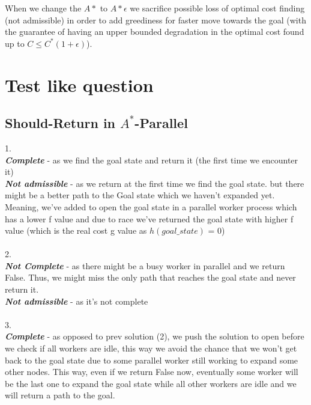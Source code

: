 \documentclass[12pt]{article}
\begin{document}
When we change the $A*$ to $A*\epsilon$ we sacrifice possible loss of optimal cost finding (not admissible)  in order to add greediness for faster move towards the goal (with the guarantee of having an upper bounded degradation in the optimal cost found up to $C \leq C^*(1+\epsilon)$).

\section{Test like question}

\subsection{Should-Return in $A^*$-Parallel}

1.\\

{\textit{\textbf{Complete}}} - as we find the goal state and return it (the first time we encounter it)\\

{\textit{\textbf{Not admissible}}} - as we return at the first time we find the goal state. but there might be a better path to the Goal state which we haven't expanded yet. Meaning, we've added to open the goal state in a parallel worker process which has a lower f value and due to race we've returned the goal state with higher f value (which is the real cost g value as $h(goal\_state)$ = 0)\\
\\
2.\\

{\textit{\textbf{Not Complete}}} - as there might be a busy worker in parallel and we return False. Thus, we might miss the only path that reaches the goal state and never return it.\\

{\textit{\textbf{Not admissible}}} - as it's not complete\\
\\
3.\\

{\textit{\textbf{Complete}}} - as opposed to prev solution (2), we push the solution to open before we check if all workers are idle, this way we avoid the chance that we won't get back to the goal state due to some parallel worker still working to expand some other nodes. This way, even if we return False now, eventually some worker will be the last one to expand the goal state while all other workers are idle and we will return a path to the goal.\\
\end{document}
